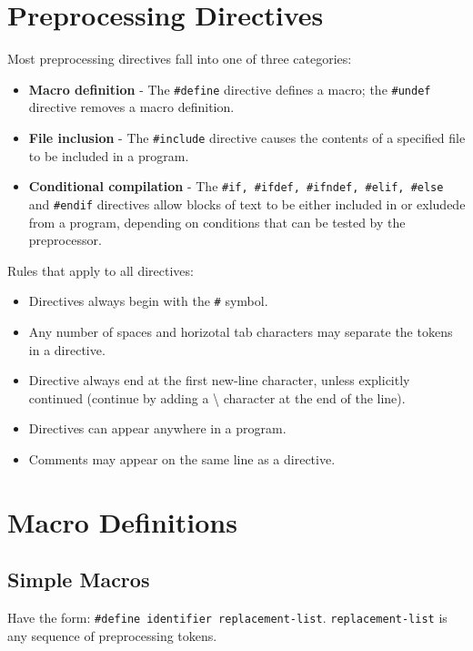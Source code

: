 \documentclass[openany]{book}
\begin{document}
    \section{Preprocessing Directives}
    
    Most preprocessing directives fall into one of three categories:
    \begin{itemize}
        \item \textbf{Macro definition} - The \texttt{\#define} directive defines a macro; the \texttt{\#undef} directive removes a macro definition.
        \item \textbf{File inclusion} - The \texttt{\#include} directive causes the contents of a specified file to be included in a program.
        \item \textbf{Conditional compilation} - The \texttt{\#if, \#ifdef, \#ifndef, \#elif, \#else} and \texttt{\#endif} directives allow blocks of text to be either included in or exludede from a program, depending on conditions that can be tested by the preprocessor.
    \end{itemize}

    \bigskip

    Rules that apply to all directives:
    \begin{itemize}
        \item Directives always begin with the \texttt{\#} symbol.
        \item Any number of spaces and horizotal tab characters may separate the tokens in a directive.
        \item Directive always end at the first new-line character, unless explicitly continued (continue by adding a \textbackslash \phantom{ } character at the end of the line).
        \item Directives can appear anywhere in a program.
        \item Comments may appear on the same line as a directive.
    \end{itemize}

    \section{Macro Definitions}

    \subsection*{Simple Macros}

    Have the form: \texttt{\#define identifier replacement-list}. \texttt{replacement-list} is any sequence of preprocessing tokens.
\end{document}
